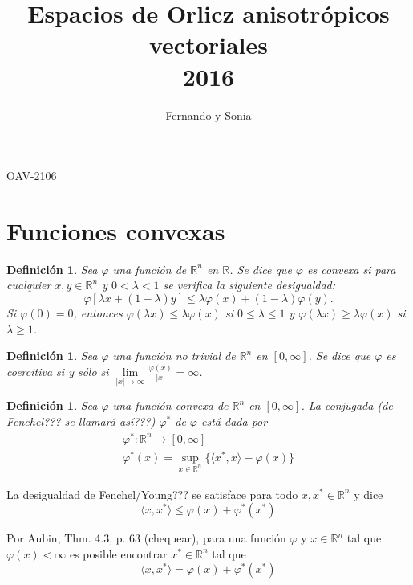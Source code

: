 \documentclass[a4paper,11pt]{amsart}
\theoremstyle{plain}
\newtheorem{defi}[thm]{Definici\'on}
\theoremstyle{remark}
\theoremstyle{remark}
\newcommand{\rr}{\mathbb{R}}
\numberwithin{equation}{section}
\begin{document}
\setlength{\baselineskip}{20pt}
\newcommand{\sig}{\hbox{\normalfont sign}}
\newcommand{\pro}{P_{\la}}
\newcommand{\di}{\displaystyle}



    \title{ Espacios de Orlicz anisotr\'opicos vectoriales\\
2016}
    \author{Fernando y Sonia }
  

    \maketitle
{OAV-2106}

\section{Funciones convexas}

\begin{defi}
Sea $\varphi$ una funci\'on de $\rr^n$ en $\rr$. Se dice que $\varphi$ es convexa si para cualquier
$x, y \in \rr ^n$ y  $0<\lambda<1$ se verifica  la siguiente desigualdad:
\[
\varphi[ \lambda x + (1  - \lambda )y] 
\leq
\lambda \varphi(x) + (1 - \lambda) \varphi(y).
\]
Si $\varphi(0)=0$, entonces $\varphi(\lambda x)\leq \lambda \varphi(x)$ si $0\leq \lambda\leq 1$ y $\varphi(\lambda x)\geq \lambda \varphi(x)$ si $\lambda \geq 1$.
\end{defi}

\begin{defi}
Sea $\varphi$ una funci\'on no trivial de $\rr^n$ en $[0,\infty]$. Se dice que $\varphi$ es coercitiva si y s\'olo si $\lim\limits_{|x|\to \infty}\frac{\varphi(x)}{|x|}=\infty$.
\end{defi}

\begin{defi}
Sea $\varphi$ una funci\'on convexa de $\rr^n$ en $[0,\infty]$. La conjugada (de Fenchel??? se llamar\'a as\'i???) $\varphi^*$ de $\varphi$ est\'a dada por
\[
\begin{split}
\varphi^*:\rr^n\to [0,\infty]
\\
\varphi^*(x)=\sup\limits_{x\in \rr^n}\{ \langle x^*,x \rangle-\varphi(x)  \}
\end{split}
\]
\end{defi}
La desigualdad de Fenchel/Young??? se satisface para todo $x,x^* \in \rr^n$ y dice 
\[
\langle x,x^*\rangle \leq \varphi(x)+\varphi^*(x^*)
\]

Por Aubin, Thm. 4.3, p. 63 (chequear), para una funci\'on $\varphi$ y $x \in \rr^n$ tal que $\varphi(x)<\infty$ es posible encontrar $x^*\in \rr^n$ tal que 
\[
\langle x,x^*\rangle = \varphi(x)+\varphi^*(x^*)
\]
\end{document}
